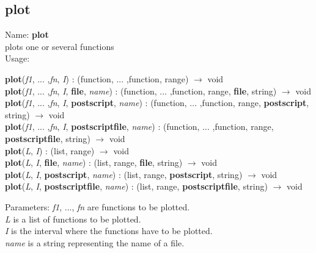 \subsection{ plot }
\noindent Name: \textbf{plot}\\
plots one or several functions\\

\noindent Usage: 
\begin{center}
\textbf{plot}(\emph{f1}, ... ,\emph{fn}, \emph{I}) : (\textsf{function}, ... ,\textsf{function}, \textsf{range}) $\rightarrow$ \textsf{void}\\
\textbf{plot}(\emph{f1}, ... ,\emph{fn}, \emph{I}, \textbf{file}, \emph{name}) : (\textsf{function}, ... ,\textsf{function}, \textsf{range}, \textbf{file}, \textsf{string}) $\rightarrow$ \textsf{void}\\
\textbf{plot}(\emph{f1}, ... ,\emph{fn}, \emph{I}, \textbf{postscript}, \emph{name}) : (\textsf{function}, ... ,\textsf{function}, \textsf{range}, \textbf{postscript}, \textsf{string}) $\rightarrow$ \textsf{void}\\
\textbf{plot}(\emph{f1}, ... ,\emph{fn}, \emph{I}, \textbf{postscriptfile}, \emph{name}) : (\textsf{function}, ... ,\textsf{function}, \textsf{range}, \textbf{postscriptfile}, \textsf{string}) $\rightarrow$ \textsf{void}\\
\textbf{plot}(\emph{L}, \emph{I}) : (\textsf{list}, \textsf{range}) $\rightarrow$ \textsf{void}\\
\textbf{plot}(\emph{L}, \emph{I}, \textbf{file}, \emph{name}) : (\textsf{list}, \textsf{range}, \textbf{file}, \textsf{string}) $\rightarrow$ \textsf{void}\\
\textbf{plot}(\emph{L}, \emph{I}, \textbf{postscript}, \emph{name}) : (\textsf{list}, \textsf{range}, \textbf{postscript}, \textsf{string}) $\rightarrow$ \textsf{void}\\
\textbf{plot}(\emph{L}, \emph{I}, \textbf{postscriptfile}, \emph{name}) : (\textsf{list}, \textsf{range}, \textbf{postscriptfile}, \textsf{string}) $\rightarrow$ \textsf{void}\\
\end{center}
Parameters: 
\emph{f1}, ..., \emph{fn} are functions to be plotted.\\
\emph{L} is a list of functions to be plotted.\\
\emph{I} is the interval where the functions have to be plotted.\\
\emph{name} is a string representing the name of a file.\\


